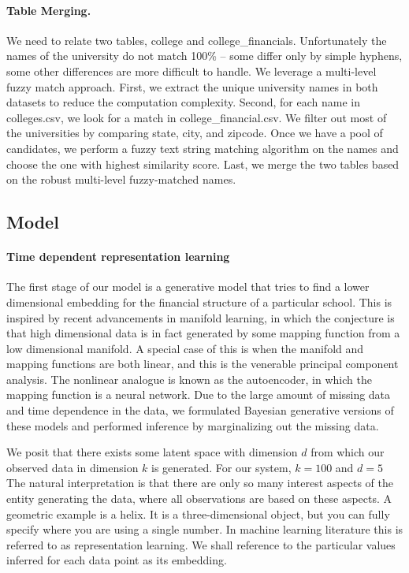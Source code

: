 \documentclass[11pt,letter]{article}
\begin{document}
\paragraph{Table Merging.} We need to relate two tables, college and college\_financials. 
Unfortunately the names of the university do not match 100\% -- some differ only by simple hyphens, some other differences are more difficult to handle. We leverage a multi-level fuzzy match approach. First, we extract the unique university names in both datasets to reduce the computation complexity. Second, for each name in colleges.csv, we look for a match in college\_financial.csv. We filter out most of the universities by comparing state, city, and zipcode. Once we have a pool of candidates, we perform a fuzzy text string matching algorithm on the names and choose the one with highest similarity score. Last, we merge the two tables based on the robust multi-level fuzzy-matched names. 



\subsection{Model}
\paragraph{Time dependent representation learning} The first stage of our model is a generative model that tries to find a lower dimensional embedding for the financial structure of a particular school. This is inspired by recent advancements in manifold learning, in which the conjecture is that high dimensional data is in fact generated by some mapping function from a low dimensional manifold. A special case of this is when the manifold and mapping functions are both linear, and this is the venerable principal component analysis. The nonlinear analogue is known as the autoencoder, in which the mapping function is a neural network. Due to the large amount of missing data and time dependence in the data, we formulated Bayesian generative versions of these models and performed inference by marginalizing out the missing data.

We posit that there exists some latent space with dimension $d$ from which our observed data in dimension $k$ is generated. For our system, $k=100$ and $d=5$ The natural interpretation is that there are only so many interest aspects of the entity generating the data, where all observations are based on these aspects. A geometric example is a helix. It is a three-dimensional object, but you can fully specify where you are using a single number. In machine learning literature this is referred to as representation learning. We shall reference to the particular values inferred for each data point as its embedding.
\end{document}
